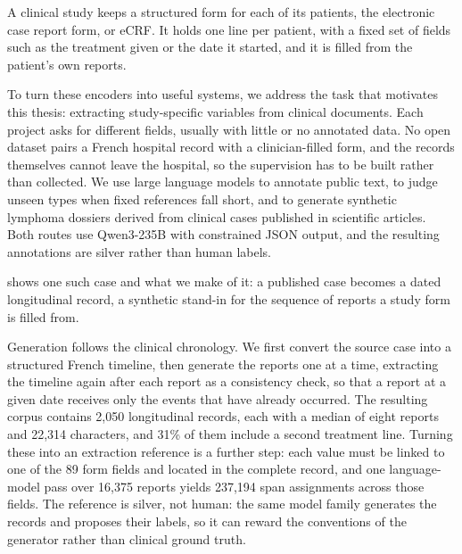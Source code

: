 
\noindent A clinical study keeps a structured form for each of its patients, the electronic
case report form, or eCRF. It holds one line per patient, with a fixed set of fields
such as the treatment given or the date it started, and it is filled from the
patient's own reports.

To turn these encoders into useful systems, we address the task that motivates this
thesis: extracting study-specific variables from clinical documents. Each project
asks for different fields, usually with little or no annotated data. No open
dataset pairs a French hospital record with a clinician-filled form, and the records
themselves cannot leave the hospital, so the supervision has to be built rather than
collected. We use large language models to annotate public text, to judge unseen
types when fixed references fall short, and to generate synthetic lymphoma dossiers
derived from clinical cases published in scientific articles. Both routes use
Qwen3-235B with constrained JSON output, and the resulting annotations are silver
rather than human labels.



 shows one such case and what we make of it: a published
case becomes a dated longitudinal record, a synthetic stand-in for the sequence of
reports a study form is filled from.

Generation follows the clinical chronology. We first convert the source case into a
structured French timeline, then generate the reports one at a time, extracting the
timeline again after each report as a consistency check, so that a report at a given
date receives only the events that have already occurred. The resulting corpus
contains 2,050 longitudinal records, each with a median of eight reports and 22,314
characters, and 31\% of them include a second treatment line. Turning these into an
extraction reference is a further step: each value must be linked to one of the 89
form fields and located in the complete record, and one language-model pass over
16,375 reports yields 237,194 span assignments across those fields. The reference is
silver, not human: the same model family generates the records and proposes their
labels, so it can reward the conventions of the generator rather than clinical
ground truth.

